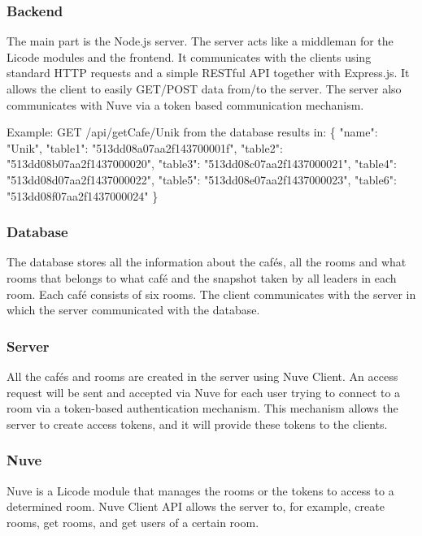 \documentclass[12pt, titlepage]{article}
\begin{document}
\subsubsection{Backend}
The main part is the Node.js server. The server acts like a middleman for the Licode modules and the frontend. It communicates with the clients using standard HTTP requests and a simple RESTful API together with Express.js. It allows the client to easily GET/POST data from/to the server. The server also communicates with Nuve via a token based communication mechanism.

\newpage Example: GET /api/getCafe/Unik from the database results in:\newline
\{ \newline
\indent "name": "Unik",\newline
\indent "table1": "513dd08a07aa2f143700001f",\newline
\indent "table2": "513dd08b07aa2f1437000020",\newline
\indent "table3": "513dd08c07aa2f1437000021",\newline
\indent "table4": "513dd08d07aa2f1437000022",\newline
\indent "table5": "513dd08e07aa2f1437000023",\newline
\indent "table6": "513dd08f07aa2f1437000024"\newline
\} \newline
\subsubsection{Database}
The database stores all the information about the cafés, all the rooms and what rooms that belongs to what café and the snapshot taken by all leaders in each room. Each café consists of six rooms. The client communicates with the server in which the server communicated with the database.
\subsubsection{Server}
All the cafés and rooms are created in the server using Nuve Client. An access request will be sent and accepted via Nuve for each user trying to connect to a room via a token-based authentication mechanism. This mechanism allows the server to create access tokens, and it will provide these tokens to the clients. 
\subsubsection{Nuve}
Nuve is a Licode module that manages the rooms or the tokens to access to a determined room. Nuve Client API allows the server to, for example, create rooms, get rooms, and get users of a certain room.
\end{document}
